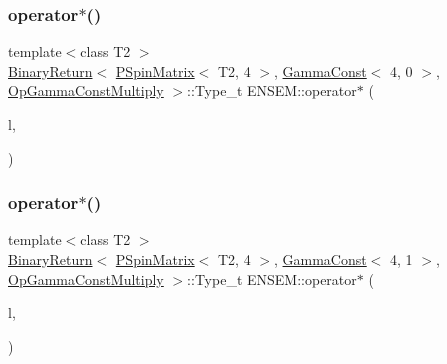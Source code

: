 \subsubsection{\texorpdfstring{operator$\ast$()}{operator*()}\hspace{0.1cm}{\footnotesize\ttfamily [17/64]}}
{\footnotesize\ttfamily template$<$class T2 $>$ \\
\mbox{\hyperlink{structENSEM_1_1BinaryReturn}{Binary\+Return}}$<$ \mbox{\hyperlink{classENSEM_1_1PSpinMatrix}{P\+Spin\+Matrix}}$<$ T2, 4 $>$, \mbox{\hyperlink{classENSEM_1_1GammaConst}{Gamma\+Const}}$<$ 4, 0 $>$, \mbox{\hyperlink{structENSEM_1_1OpGammaConstMultiply}{Op\+Gamma\+Const\+Multiply}} $>$\+::Type\+\_\+t E\+N\+S\+E\+M\+::operator$\ast$ (\begin{DoxyParamCaption}\item[{const \mbox{\hyperlink{classENSEM_1_1PSpinMatrix}{P\+Spin\+Matrix}}$<$ T2, 4 $>$ \&}]{l,  }\item[{const \mbox{\hyperlink{classENSEM_1_1GammaConst}{Gamma\+Const}}$<$ 4, 0 $>$ \&}]{ }\end{DoxyParamCaption})\hspace{0.3cm}{\ttfamily [inline]}}

\mbox{\label{group__primspinmatrix_gaf4a854dbb554a35d450e52f9edaae13e}} 
\subsubsection{\texorpdfstring{operator$\ast$()}{operator*()}\hspace{0.1cm}{\footnotesize\ttfamily [18/64]}}
{\footnotesize\ttfamily template$<$class T2 $>$ \\
\mbox{\hyperlink{structENSEM_1_1BinaryReturn}{Binary\+Return}}$<$ \mbox{\hyperlink{classENSEM_1_1PSpinMatrix}{P\+Spin\+Matrix}}$<$ T2, 4 $>$, \mbox{\hyperlink{classENSEM_1_1GammaConst}{Gamma\+Const}}$<$ 4, 1 $>$, \mbox{\hyperlink{structENSEM_1_1OpGammaConstMultiply}{Op\+Gamma\+Const\+Multiply}} $>$\+::Type\+\_\+t E\+N\+S\+E\+M\+::operator$\ast$ (\begin{DoxyParamCaption}\item[{const \mbox{\hyperlink{classENSEM_1_1PSpinMatrix}{P\+Spin\+Matrix}}$<$ T2, 4 $>$ \&}]{l,  }\item[{const \mbox{\hyperlink{classENSEM_1_1GammaConst}{Gamma\+Const}}$<$ 4, 1 $>$ \&}]{ }\end{DoxyParamCaption})\hspace{0.3cm}{\ttfamily [inline]}}


